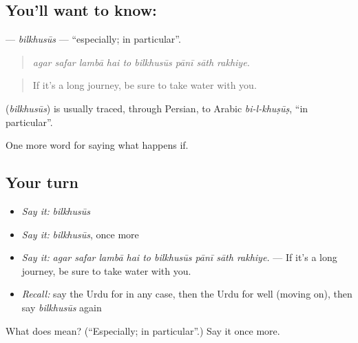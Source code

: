 \subsection*{You'll want to know: }
\textbf{} — \emph{bilkhusūs} — \textquotedblleft{}especially; in particular\textquotedblright{}.

\begin{quote}
        
\end{quote}

\begin{quote}
\emph{agar safar lambā hai to bilkhusūs pānī sāth rakhiye.}
\end{quote}

\begin{quote}
If it's a long journey, be sure to take water with you.
\end{quote}

\begin{cousinweb}
\textbf{} (\emph{bilkhusūs}) is usually traced, through Persian, to Arabic \emph{bi-l-khuṣūṣ}, \textquotedblleft{}in particular\textquotedblright{}.
\end{cousinweb}

\begin{grammarlens}[title={What you've built}]
One more word for saying what happens if.
\end{grammarlens}

\subsection*{Your turn}
\begin{itemize}
\raggedright
  \item \emph{Say it:} \emph{bilkhusūs}
  \item \emph{Say it:} \emph{bilkhusūs}, once more
  \item \emph{Say it:} \emph{agar safar lambā hai to bilkhusūs pānī sāth rakhiye.} — If it's a long journey, be sure to take water with you.
  \item \emph{Recall:} say the Urdu for in any case, then the Urdu for well (moving on), then say \emph{bilkhusūs} again
\end{itemize}

\begin{tcolorbox}[breakable,colback=teal!4,colframe=teal!35!black,title={Before you move on}]
What does  mean? (\textquotedblleft{}Especially; in particular\textquotedblright{}.) Say it once more.
\end{tcolorbox}
